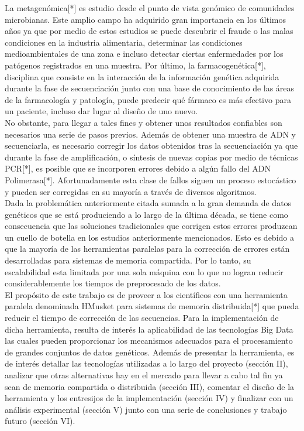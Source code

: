 \documentclass[conference]{IEEEtran}
\begin{document}
La metagenómica[*] es estudio desde el punto de vista genómico de comunidades microbianas. Este amplio campo ha adquirido gran importancia en los últimos años ya que por medio de estos estudios se puede descubrir el fraude o las malas condiciones en la industria alimentaria, determinar las condiciones medioambientales de una zona e incluso detectar ciertas enfermedades por los patógenos registrados en una muestra. Por último, la farmacogenética[*], disciplina que consiste en la interacción de la información genética adquirida durante la fase de secuenciación junto con una base de conocimiento de las áreas de la farmacología y patología, puede predecir qué fármaco es más efectivo para un paciente, incluso dar lugar al diseño de uno nuevo.
\\

No obstante, para llegar a tales fines y obtener unos resultados confiables son necesarios una serie de pasos previos. Además de obtener una muestra de ADN y secuenciarla, es necesario corregir los datos obtenidos tras la secuenciación ya que durante la fase de amplificación, o síntesis de nuevas copias por medio de técnicas PCR[*], es posible que se incorporen errores debido a algún fallo del ADN Polimerasa[*]. Afortunadamente esta clase de fallos siguen un proceso estocástico y pueden ser corregidas en su mayoría a través de diversos algoritmos.
\\

Dada la problemática anteriormente citada sumada a la gran demanda de datos genéticos que se está produciendo a lo largo de la última década, se tiene como consecuencia que las soluciones tradicionales que corrigen estos errores produzcan un cuello de botella en los estudios anteriormente mencionados. Esto es debido a que la mayoría de las herramientas paralelas para la corrección de errores están desarrolladas para sistemas de memoria compartida. Por lo tanto, su escalabilidad esta limitada por una sola máquina con lo que no logran reducir considerablemente los tiempos de preprocesado de los datos.
\\

El propósito de este trabajo es de proveer a los científicos con una herramienta paralela denominada HMusket para sistemas de memoria distribuida[*] que pueda reducir el tiempo de corrección de las secuencias. Para la implementación de dicha herramienta, resulta de interés la aplicabilidad de las tecnologías Big Data las cuales pueden proporcionar los mecanismos adecuados para el procesamiento de grandes conjuntos de datos genéticos. Además de presentar la herramienta, es de interés detallar las tecnologías utilizadas a lo largo del proyecto (sección II), analizar que otras alternativas hay en el mercado para llevar a cabo tal fin ya sean de memoria compartida o distribuida (sección III), comentar el diseño de la herramienta y los entresijos de la implementación (sección IV) y finalizar con un análisis experimental (sección V)  junto con una serie de conclusiones y trabajo futuro (sección VI).\\
\end{document}
